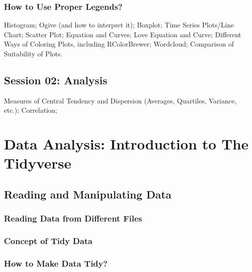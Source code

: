 \documentclass[
]{book}
\begin{document}
\hypertarget{how-to-use-proper-legends}{%
\subsection{How to Use Proper Legends?}\label{how-to-use-proper-legends}}

Histogram; Ogive (and how to interpret it); Boxplot; Time Series Plots/Line Chart; Scatter Plot; Equation and Curves; Love Equation and Curve; Different Ways of Coloring Plots, including RColorBrewer; Wordcloud; Comparison of Suitability of Plots.

\hypertarget{session-02-analysis}{%
\section{Session 02: Analysis}\label{session-02-analysis}}

Measures of Central Tendency and Dispersion (Averages, Quartiles, Variance, etc.); Correlation;

\hypertarget{tidy-1}{%
\chapter{Data Analysis: Introduction to The Tidyverse}\label{tidy-1}}

\hypertarget{reading-and-manipulating-data}{%
\section{Reading and Manipulating Data}\label{reading-and-manipulating-data}}

\hypertarget{reading-data-from-different-files}{%
\subsection{Reading Data from Different Files}\label{reading-data-from-different-files}}

\hypertarget{concept-of-tidy-data}{%
\subsection{Concept of Tidy Data}\label{concept-of-tidy-data}}

\hypertarget{how-to-make-data-tidy}{%
\subsection{How to Make Data Tidy?}\label{how-to-make-data-tidy}}
\end{document}
